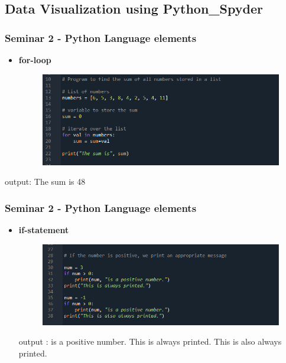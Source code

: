 \documentclass{beamer}
\begin{document}
\subsection{Data Visualization using Python\_Spyder} %
\begin{frame}
\frametitle{Seminar 2 - Python Language elements}

\begin{itemize}
\item \textbf{for-loop}\newline
   \begin{figure}
   \includegraphics[width=0.9\linewidth]{Seminar_2_images/Python/for.png} 
   \end{figure}
\end{itemize}
 output: The sum is 48
\end{frame}   
\begin{frame}[fragile]
\frametitle{Seminar 2 - Python Language elements }
\begin{itemize}
\item \textbf{if-statement}\newline
 \begin{figure} 
   \includegraphics[width=0.9\linewidth]{Seminar_2_images/Python/b py 1.png} 
   \end{figure} 
   output : is a positive number.\newline
             This is always printed.\newline
             This is also always printed.\newline
\end{itemize}
\end{frame}
\end{document}
